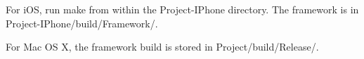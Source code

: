 \-For i\-O\-S, run {\ttfamily make} from within the {\ttfamily \-Project-\/\-I\-Phone} directory. \-The framework is in {\ttfamily \-Project-\/\-I\-Phone/build/\-Framework/}.

\-For \-Mac \-O\-S \-X, the framework build is stored in {\ttfamily \-Project/build/\-Release/}. 